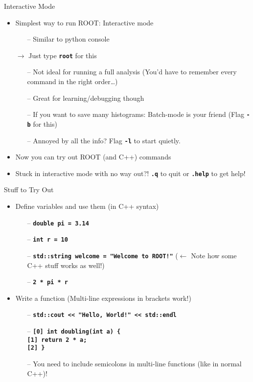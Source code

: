 \documentclass[10pt, aspectratio=169]{beamer}
\begin{document}
\begin{frame}{Interactive Mode}
  \begin{itemize}
    \item
      Simplest way to run ROOT: Interactive mode
    \begin{itemize}
      \item[--] Similar to python console
    \end{itemize}
    \item[$\rightarrow$]
      Just type \textbf{\texttt{root}} for this
    \begin{itemize}
      \item[--] Not ideal for running a full analysis (You'd have to remember every command in the right order\ldots)
      \item[--] Great for learning/debugging though
      \item[--] If you want to save many histograms: Batch-mode is your friend (Flag \textbf{\texttt{-b}} for this)
      \item[--] Annoyed by all the info? Flag \textbf{\texttt{-l}} to start quietly.
    \end{itemize}
    \item
      Now you can try out ROOT (and C++) commands
    \item
      Stuck in interactive mode with no way out?! \textbf{\texttt{.q}} to quit or \textbf{\texttt{.help}} to get help!
  \end{itemize}
\end{frame}

\begin{frame}{Stuff to Try Out}
  \begin{itemize}
    \item
      Define variables and use them (in C++ syntax)
    \begin{itemize}
      \item[--] \textbf{\texttt{double pi = 3.14}}
      \item[--] \textbf{\texttt{int r = 10}}
      \item[--] \textbf{\texttt{std::string welcome = "Welcome to ROOT!"}} ($\leftarrow$ Note how some C++ stuff works as well!)
      \item[--] \textbf{\texttt{2 * pi * r}}
    \end{itemize}
    \item
      Write a function (Multi-line expressions in brackets work!)
    \begin{itemize}
      \item[--] \textbf{\texttt{std::cout << "Hello, World!" << std::endl}}
      \item[--] \textbf{\texttt{[0] int doubling(int a) \{}} \\
                \textbf{\texttt{[1] return 2 * a;}} \\
                \textbf{\texttt{[2] \}}}
      \item[--] You need to include semicolons in multi-line functions (like in normal C++)!
    \end{itemize}
  \end{itemize}
  
\end{frame}
\end{document}
